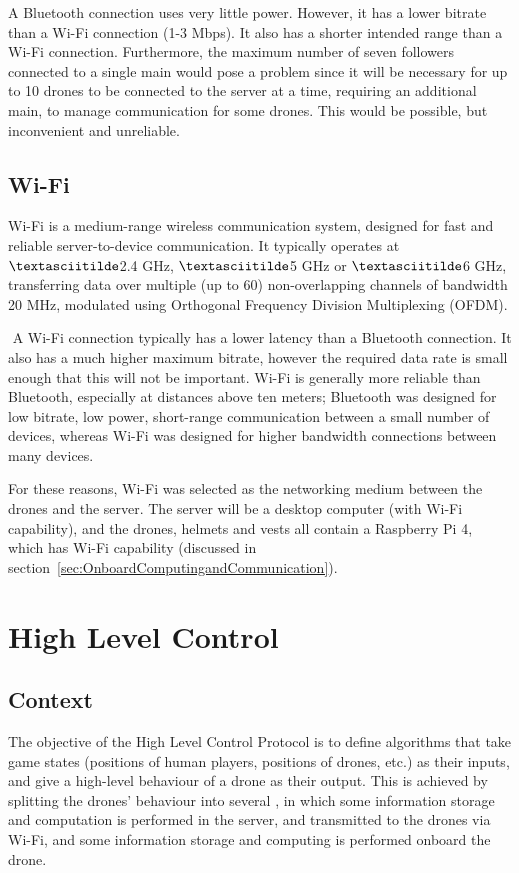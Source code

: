 \documentclass{report_template_oxford}
\begin{document}
\(\)\newline A Bluetooth connection uses very little power. However, it has a lower bitrate than a Wi-Fi connection (1-3 Mbps). It also has a shorter intended range than a Wi-Fi connection. Furthermore, the maximum number of seven followers connected to a single main would pose a problem since it will be necessary for up to 10 drones to be connected to the server at a time, requiring an additional main, to manage communication for some drones. This would be possible, but inconvenient and unreliable.

\subsection{Wi-Fi}
Wi-Fi is a medium-range wireless communication system, designed for fast and reliable server-to-device communication. It typically operates at \(\textasciitilde\)2.4 GHz, \(\textasciitilde\)5 GHz or \(\textasciitilde\)6 GHz, transferring data over multiple (up to 60) non-overlapping channels of bandwidth 20 MHz, modulated using Orthogonal Frequency Division Multiplexing (OFDM).

\(\) \newline A Wi-Fi connection typically has a lower latency than a Bluetooth connection. It also has a much higher maximum bitrate, however the required data rate is small enough that this will not be important. Wi-Fi is generally more reliable than Bluetooth, especially at distances above ten meters; Bluetooth was designed for low bitrate, low power, short-range communication between a small number of devices, whereas Wi-Fi was designed for higher bandwidth connections between many devices.

\(\)\newline For these reasons, Wi-Fi was selected as the networking medium between the drones and the server. The server will be a desktop computer (with Wi-Fi capability), and the drones, helmets and vests all contain a Raspberry Pi 4, which has Wi-Fi capability (discussed in section~\ref{sec:OnboardComputingandCommunication}).

\newpage
\section{High Level Control} \label{high level control} %
\subsection{Context}
The objective of the High Level Control Protocol is to define algorithms that take game states (positions of human players, positions of drones, etc.) as their inputs, and give a high-level behaviour of a drone as their output. This is achieved by splitting the drones' behaviour into several , in which some information storage and computation is performed in the server, and transmitted to the drones via Wi-Fi, and some information storage and computing is performed onboard the drone.
\end{document}
